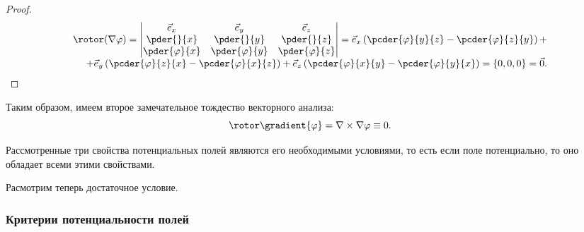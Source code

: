\begin{enumerate}
\begin{proof}
	\[ \begin{array}{r} \rotor(\nabla\varphi) = \begin{vmatrix}
	\vec{e}_x & \vec{e}_y & \vec{e}_z \\
	\pder{}{x} & \pder{}{y} & \pder{}{z} \\
	\pder{\varphi}{x} & \pder{\varphi}{y} & \pder{\varphi}{z}
	\end{vmatrix} = \vec{e}_x\left(\pcder{\varphi}{y}{z} - \pcder{\varphi}{z}{y}\right) + \\
	+  \vec{e}_y\left(\pcder{\varphi}{z}{x} - \pcder{\varphi}{x}{z}\right) +  \vec{e}_z\left(\pcder{\varphi}{x}{y} - \pcder{\varphi}{y}{x}\right) = \{ 0, 0, 0 \} = \vec{0}.   \end{array} \]
	\end{proof}
	
	Таким образом, имеем второе замечательное тождество векторного анализа:
	\[ \rotor\gradient{\varphi} = \nabla\times\nabla\varphi \equiv 0. \]
	\end{enumerate}
	
	Рассмотренные три свойства потенциальных полей являются его необходимыми условиями, то есть если поле потенциально, то оно обладает всеми этими свойствами.
	
	Расмотрим теперь достаточное условие.
	
\subsubsection{Критерии потенциальности полей}

